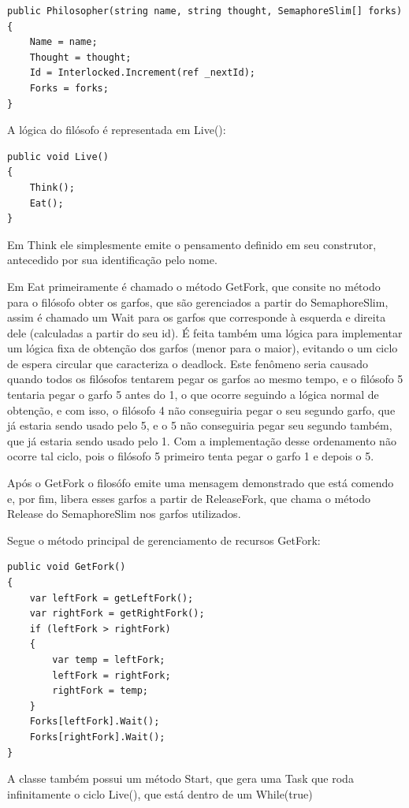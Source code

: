 \documentclass[
	12pt,				%
	oneside,			%
	a4paper,			%
	english,			%
	brazil,				%
	]{abntex2}
\begin{document}
{\begin{lstlisting}
public Philosopher(string name, string thought, SemaphoreSlim[] forks)
{
    Name = name;
    Thought = thought;
    Id = Interlocked.Increment(ref _nextId);
    Forks = forks;
}
\end{lstlisting}

A lógica do filósofo é representada em Live():

\begin{lstlisting}
public void Live()
{
    Think();
    Eat();
}
\end{lstlisting}

Em Think ele simplesmente emite o pensamento definido em seu construtor, antecedido por sua identificação pelo nome.

Em Eat primeiramente é chamado o método GetFork, que consite no método para o filósofo obter os garfos, que são gerenciados a partir do SemaphoreSlim, assim é chamado um Wait para os garfos que corresponde à esquerda e direita dele (calculadas a partir do seu id). É feita também uma lógica para implementar um lógica fixa de obtenção dos garfos (menor para o maior), evitando o um ciclo de espera circular que caracteriza o deadlock. Este fenômeno seria causado quando todos os filósofos tentarem pegar os garfos ao mesmo tempo, e o filósofo 5 tentaria pegar o garfo 5 antes do 1, o que ocorre seguindo a lógica normal de obtenção, e com isso, o filósofo 4 não conseguiria pegar o seu segundo garfo, que já estaria sendo usado pelo 5, e o 5 não conseguiria pegar seu segundo também, que já estaria sendo usado pelo 1. Com a implementação desse ordenamento não ocorre tal ciclo, pois o filósofo 5 primeiro tenta pegar o garfo 1 e depois o 5.

Após o GetFork o filosófo emite uma mensagem demonstrado que está comendo e, por fim, libera esses garfos a partir de ReleaseFork, que chama o método Release do SemaphoreSlim nos garfos utilizados.

Segue o método principal de gerenciamento de recursos GetFork:

\begin{lstlisting}
public void GetFork()
{
    var leftFork = getLeftFork();
    var rightFork = getRightFork();
    if (leftFork > rightFork)
    {
        var temp = leftFork;
        leftFork = rightFork;
        rightFork = temp;
    }
    Forks[leftFork].Wait();
    Forks[rightFork].Wait();
}
\end{lstlisting}

A classe também possui um método Start, que gera uma Task que roda infinitamente o ciclo Live(), que está dentro de um While(true)

}
\end{document}

